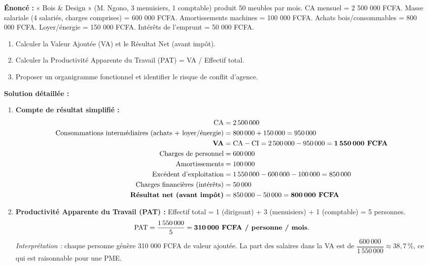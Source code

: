 \documentclass[11pt]{article}
\newcommand{\cle}[1]{{\popxbold\color{popdark}#1}}
\begin{document}
\begin{exoresolu}
    \textbf{Énoncé :} « Bois \& Design » (M. Ngono, 3 menuisiers, 1 comptable) produit 50 meubles par mois. CA mensuel = 2 500 000 FCFA. Masse salariale (4 salariés, charges comprises) = 600 000 FCFA. Amortissements machines = 100 000 FCFA. Achats bois/consommables = 800 000 FCFA. Loyer/énergie = 150 000 FCFA. Intérêts de l'emprunt = 50 000 FCFA.
    \begin{enumerate}
        \item Calculer la \cle{Valeur Ajoutée (VA)} et le \cle{Résultat Net} (avant impôt).
        \item Calculer la \cle{Productivité Apparente du Travail (PAT)} = VA / Effectif total.
        \item Proposer un organigramme fonctionnel et identifier le risque de \cle{conflit d'agence}.
    \end{enumerate}
    \tcblower
    \textbf{Solution détaillée :}
    \begin{enumerate}
        \item \textbf{Compte de résultat simplifié :}
              \begin{align*}
                  \text{CA} &= 2\,500\,000 \\
                  \text{Consommations intermédiaires (achats + loyer/énergie)} &= 800\,000 + 150\,000 = 950\,000 \\
                  \textbf{VA} &= \text{CA} - \text{CI} = 2\,500\,000 - 950\,000 = \textbf{1\,550\,000 FCFA} \\
                  \text{Charges de personnel} &= 600\,000 \\
                  \text{Amortissements} &= 100\,000 \\
                  \text{Excédent d'exploitation} &= 1\,550\,000 - 600\,000 - 100\,000 = 850\,000 \\
                  \text{Charges financières (intérêts)} &= 50\,000 \\
                  \textbf{Résultat net (avant impôt)} &= 850\,000 - 50\,000 = \textbf{800\,000 FCFA}
              \end{align*}
        \item \textbf{Productivité Apparente du Travail (PAT) :}
              Effectif total = 1 (dirigeant) + 3 (menuisiers) + 1 (comptable) = 5 personnes.
              \[ \text{PAT} = \frac{1\,550\,000}{5} = \textbf{310\,000 FCFA / personne / mois}. \]
              \emph{Interprétation :} chaque personne génère 310 000 FCFA de valeur ajoutée. La part des salaires dans la VA est de $\dfrac{600\,000}{1\,550\,000} \approx 38,7\,\%$, ce qui est raisonnable pour une PME.

\end{enumerate}
\end{exoresolu}
\end{document}
